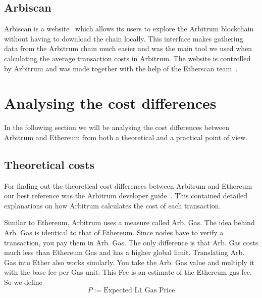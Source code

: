 \documentclass[a4paper,oneside,openright,11pt]{report}
\begin{document}
\section{Arbiscan}
Arbiscan is a website~\cite{Arbiscan} which allows its users to explore the Arbitrum 
blockchain without having to download the chain locally. This interface makes 
gathering data from the Arbitrum chain much easier and was the main tool we used 
when calculating the average transaction costs in Arbitrum.
The website is controlled by Arbitrum and was made together with the help of the 
Etherscan team~\cite{ArbEthScan}.

\chapter{Analysing the cost differences}
In the following section we will be analysing the cost differences between Arbitrum and Ethereum
from both a theoretical and a practical point of view.

\section{Theoretical costs}
For finding out the theoretical cost differences between Arbitrum and Ethereum our best reference was
the Arbitrum developer guide~\cite{ArbDevGuide}. This contained detailed explanations on how Arbitrum
calculates the cost of each transaction.

Similar to Ethereum, Arbitrum uses a measure called Arb. Gas. The idea behind Arb. Gas is 
identical to that of Ethereum. Since nodes have to verify a transaction, you pay them
in Arb. Gas. The only difference is that Arb. Gas costs much less than Ethereum Gas and has
a higher global limit. Translating Arb. Gas into Ether also works similarly. You take the 
Arb. Gas value and multiply it with the base fee per Gas unit. This Fee is an estimate
of the Ethereum gas fee. So we define
\[
	P := \text{Expected L1 Gas Price}
\]
\end{document}
